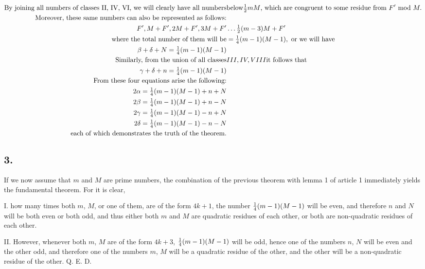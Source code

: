 \documentclass[twoside,12pt, showframe]{memoir}
\let\oldfrac\frac
\def\frac#1#2{\mathchoice{\tfrac{#1}{#2}}{\oldfrac{#1}{#2}}{\genfrac{}{}{}{2}{#1}{#2\mathstrut}}{\genfrac{}{}{}{3}{#1}{#2\mathstrut}}}
\begin{document}
\begin{align*}
\text{By joining all numbers of classes II, IV, VI, we will clearly have all numbers} & \text{below}\frac{1}{2} m M\text{, which are congruent to some residue from }F^{\prime}\text{ mod }M.\\
\text{Moreover, these same numbers can also be represented as follows:} & \\
F^{\prime}, M+F^{\prime}, 2 M+F^{\prime}, 3 M+F^{\prime} & \ldots \frac{1}{2}(m-3) M+F^{\prime}\\
\text{where the total number of them will be} & =\frac{1}{4}(m-1)(M-1), \text{ or we will have}\\
\beta+\delta+N=\frac{1}{4}(m-1)(M-1) & \\
\text{Similarly, from the union of all classes} & III, IV, VIII \text{it follows that}\\
\gamma+\delta+n=\frac{1}{4}(m-1)(M-1) & \\
\text{From these four equations arise the following:} & \\
2 \alpha=\frac{1}{4}(m-1)(M-1)+n+N & \\
2 \beta=\frac{1}{4}(m-1)(M-1)+n-N & \\
2 \gamma=\frac{1}{4}(m-1)(M-1)-n+N & \\
2 \delta=\frac{1}{4}(m-1)(M-1)-n-N & \\
\text{each of which demonstrates the truth of the theorem.} &
\end{align*}
%

\subsection*{3.}
 
If we now assume that \(m\) and \(M\) are prime numbers, the combination of the previous theorem with lemma 1 of article 1 immediately yields the fundamental theorem. For it is clear, 
 
I. how many times both \(m\), \(M\), or one of them, are of the form \(4k+1\), the number \(\frac{1}{4}(m-1)(M-1)\) will be even, and therefore \(n\) and \(N\) will be both even or both odd, and thus either both \(m\) and \(M\) are quadratic residues of each other, or both are non-quadratic residues of each other. 
 
II. However, whenever both \(m\), \(M\) are of the form \(4k+3\), \(\frac{1}{4}(m-1)(M-1)\) will be odd, hence one of the numbers \(n\), \(N\) will be even and the other odd, and therefore one of the numbers \(m\), \(M\) will be a quadratic residue of the other, and the other will be a non-quadratic residue of the other. Q. E. D.\clearpage\noindent
%
\end{document}
